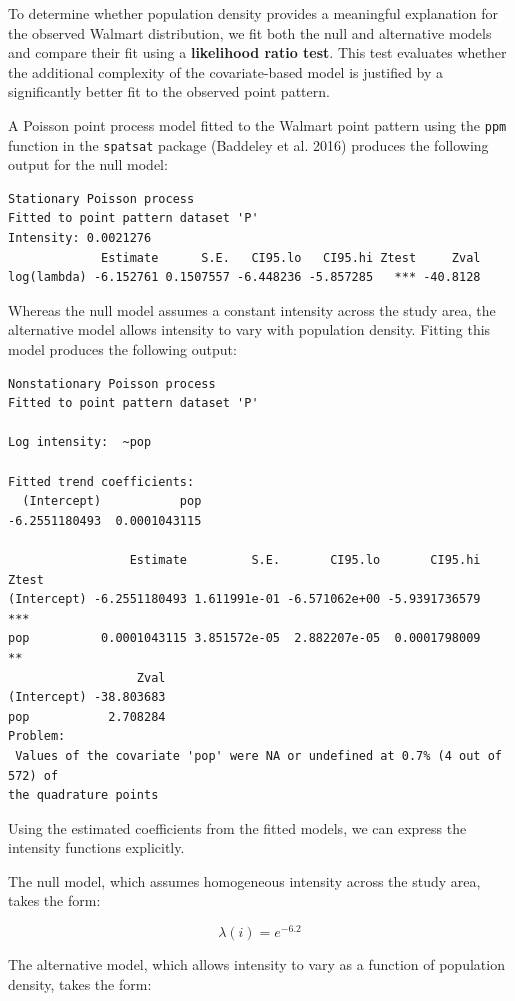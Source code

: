 \documentclass[
  letterpaper,
]{book}
\begin{document}
To determine whether population density provides a meaningful
explanation for the observed Walmart distribution, we fit both the null
and alternative models and compare their fit using a \textbf{likelihood
ratio test}. This test evaluates whether the additional complexity of
the covariate-based model is justified by a significantly better fit to
the observed point pattern.

A Poisson point process model fitted to the Walmart point pattern using
the \texttt{ppm} function in the \texttt{spatsat} package (Baddeley et
al. 2016) produces the following output for the null model:

\begin{verbatim}
Stationary Poisson process
Fitted to point pattern dataset 'P'
Intensity: 0.0021276
             Estimate      S.E.   CI95.lo   CI95.hi Ztest     Zval
log(lambda) -6.152761 0.1507557 -6.448236 -5.857285   *** -40.8128
\end{verbatim}

Whereas the null model assumes a constant intensity across the study
area, the alternative model allows intensity to vary with population
density. Fitting this model produces the following output:

\begin{verbatim}
Nonstationary Poisson process
Fitted to point pattern dataset 'P'

Log intensity:  ~pop

Fitted trend coefficients:
  (Intercept)           pop 
-6.2551180493  0.0001043115 

                 Estimate         S.E.       CI95.lo       CI95.hi Ztest
(Intercept) -6.2551180493 1.611991e-01 -6.571062e+00 -5.9391736579   ***
pop          0.0001043115 3.851572e-05  2.882207e-05  0.0001798009    **
                  Zval
(Intercept) -38.803683
pop           2.708284
Problem:
 Values of the covariate 'pop' were NA or undefined at 0.7% (4 out of 572) of 
the quadrature points
\end{verbatim}

Using the estimated coefficients from the fitted models, we can express
the intensity functions explicitly.

The null model, which assumes homogeneous intensity across the study
area, takes the form:

\[
\lambda(i) = e^{-6.2}
\]

The alternative model, which allows intensity to vary as a function of
population density, takes the form:
\end{document}
